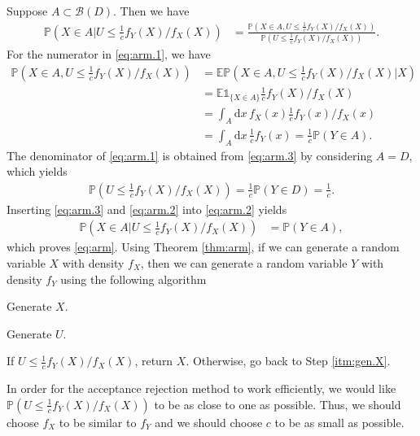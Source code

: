 \documentclass[12pt]{book}
\numberwithin{equation}{chapter}
\theoremstyle{plain}
\numberwithin{theorem}{section}
\theoremstyle{definition}
\numberwithin{exercise}{chapter}
\let\oldendproof\endproof
\renewenvironment{proof}[1][\proofname]{%
  \oldproof[\scshape\underline{#1}]%
}{\oldendproof}
\newcommand{\<}{\langle}
\renewcommand{\>}{\rangle}
\renewcommand{\(}{\left(}
\renewcommand{\)}{\right)}
\renewcommand{\[}{\left[}
\renewcommand{\]}{\right]}
\newcommand\Eb{\mathds{E}}
\newcommand\Ib{\mathds{1}} 	%
\newcommand\Pb{\mathds{P}}
\newcommand\Bc{\mathscr{B}}
\newcommand\dd{\mathrm{d}}
\begin{document}
\begin{proof}
Suppose $A \subset \Bc(D)$.  Then we have
\begin{align}
\Pb \( X \in A | U \leq \tfrac{1}{c} f_Y(X)/f_X(X) \) 
	&=	\frac{ \Pb \( X \in A , U \leq \tfrac{1}{c} f_Y(X)/f_X(X) \) }{ \Pb \( U \leq \tfrac{1}{c} f_Y(X)/f_X(X) \) } . \label{eq:arm.1}
\end{align}
For the numerator in \eqref{eq:arm.1}, we have
\begin{align}
\Pb \( X \in A , U \leq \tfrac{1}{c} f_Y(X)/f_X(X) \)
	&=	\Eb \Pb \( X \in A , U \leq \tfrac{1}{c} f_Y(X)/f_X(X) | X \) \\
	&=	\Eb \Ib_{\{X \in A \}} \tfrac{1}{c} f_Y(X)/f_X(X) \\
	&=	\int_A \dd x \, f_X(x) \tfrac{1}{c} f_Y(x)/f_X(x) \\
	&=		\int_A \dd x \, \tfrac{1}{c} f_Y(x) 
	=		\tfrac{1}{c} \Pb( Y \in A ) . \label{eq:arm.3}
\end{align}
The denominator of \eqref{eq:arm.1} is obtained from \eqref{eq:arm.3} by considering $A = D$, which yields
\begin{align}
\Pb \( U \leq \tfrac{1}{c} f_Y(X)/f_X(X) \)
	=		\tfrac{1}{c} \Pb( Y \in D ) = \tfrac{1}{c} . \label{eq:arm.2}
\end{align}
Inserting \eqref{eq:arm.3} and \eqref{eq:arm.2} into \eqref{eq:arm.2} yields
\begin{align}
\Pb \( X \in A | U \leq \tfrac{1}{c} f_Y(X)/f_X(X) \) 
	&=	\Pb( Y \in A ) ,
\end{align}
which proves \eqref{eq:arm}.
\end{proof}
\noindent
Using Theorem \ref{thm:arm}, if we can generate a random variable $X$ with density $f_X$, then we can generate a random variable $Y$ with density $f_Y$ using the following algorithm
\begin{enumerate*}
\item Generate $X$. \label{itm:gen.X}
\item Generate $U$.
\item If $U \leq \tfrac{1}{c} f_Y(X)/f_X(X)$, return $X$.  Otherwise, go back to Step \ref{itm:gen.X}.
\end{enumerate*}
In order for the acceptance rejection method to work efficiently, we would like $\Pb( U \leq \tfrac{1}{c} f_Y(X)/f_X(X) )$ to be as close to one as possible.  Thus, we should choose $f_X$ to be similar to $f_Y$ and we should choose $c$ to be as small as possible.
\end{document}
